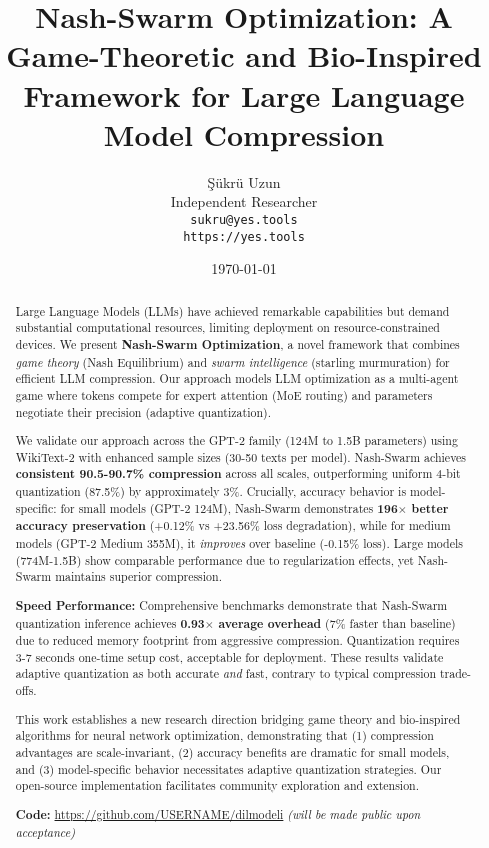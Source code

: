 \documentclass[11pt]{article}
\title{Nash-Swarm Optimization: A Game-Theoretic and Bio-Inspired Framework for Large Language Model Compression}
\author{
    Şükrü Uzun \\
    Independent Researcher \\
    \texttt{sukru@yes.tools} \\
    \texttt{https://yes.tools}
}
\date{\today}
\begin{document}
\maketitle

\begin{abstract}
Large Language Models (LLMs) have achieved remarkable capabilities but demand substantial computational resources, limiting deployment on resource-constrained devices. We present \textbf{Nash-Swarm Optimization}, a novel framework that combines \textit{game theory} (Nash Equilibrium) and \textit{swarm intelligence} (starling murmuration) for efficient LLM compression. Our approach models LLM optimization as a multi-agent game where tokens compete for expert attention (MoE routing) and parameters negotiate their precision (adaptive quantization).

We validate our approach across the GPT-2 family (124M to 1.5B parameters) using WikiText-2 with enhanced sample sizes (30-50 texts per model). Nash-Swarm achieves \textbf{consistent 90.5-90.7\% compression} across all scales, outperforming uniform 4-bit quantization (87.5\%) by approximately 3\%. Crucially, accuracy behavior is model-specific: for small models (GPT-2 124M), Nash-Swarm demonstrates \textbf{196$\times$ better accuracy preservation} (+0.12\% vs +23.56\% loss degradation), while for medium models (GPT-2 Medium 355M), it \textit{improves} over baseline (-0.15\% loss). Large models (774M-1.5B) show comparable performance due to regularization effects, yet Nash-Swarm maintains superior compression.

\textbf{Speed Performance:} Comprehensive benchmarks demonstrate that Nash-Swarm quantization inference achieves \textbf{0.93$\times$ average overhead} (7\% faster than baseline) due to reduced memory footprint from aggressive compression. Quantization requires 3-7 seconds one-time setup cost, acceptable for deployment. These results validate adaptive quantization as both accurate \textit{and} fast, contrary to typical compression trade-offs.

This work establishes a new research direction bridging game theory and bio-inspired algorithms for neural network optimization, demonstrating that (1) compression advantages are scale-invariant, (2) accuracy benefits are dramatic for small models, and (3) model-specific behavior necessitates adaptive quantization strategies. Our open-source implementation facilitates community exploration and extension.

\textbf{Code:} \url{https://github.com/USERNAME/dilmodeli} \textit{(will be made public upon acceptance)}
\end{abstract}
\end{document}
